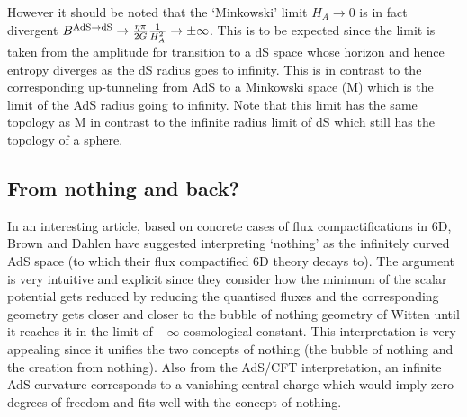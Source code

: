 \documentclass[a4paper,11pt]{article}
\numberwithin{equation}{section}
\newcommand{\citep}{\cite}
\numberwithin{equation}{section}
\begin{document}
However it should be noted that the `Minkowski' limit $H_{A} \rightarrow 0$
is in fact divergent $B^{{\rm AdS \rightarrow dS}}\rightarrow\frac{\eta\pi}{2G}\frac{1}{H_{A}^{2}}\rightarrow\pm\infty$.
This is to be expected since the limit is taken from the amplitude
for transition to a dS space whose horizon and hence entropy diverges
as the dS radius goes to infinity. This is in contrast to the corresponding
up-tunneling from AdS to a Minkowski space (M) which is the limit of the AdS radius going to infinity. Note
that this limit has the same topology as M in contrast to the infinite radius limit of dS which still has the topology of a sphere.


\subsection{From nothing and back?}

In an interesting article, based on concrete cases of flux compactifications in 6D, Brown and Dahlen \citep{Brown:2011gt} have suggested interpreting
‘nothing' as the infinitely curved AdS space (to which their flux
compactified 6D theory decays to). The argument is very intuitive and explicit since they consider how the minimum of the scalar potential gets reduced by reducing the quantised fluxes and the corresponding geometry gets closer and closer to the bubble of nothing geometry of Witten  \citep{Witten:1981gj} until it reaches it in the limit of $-\infty$ cosmological constant. This interpretation is very appealing since it unifies the two concepts of nothing (the bubble of nothing and the creation from nothing). Also from the AdS/CFT interpretation, an infinite AdS curvature corresponds to a vanishing central charge which  would imply zero degrees of freedom and fits well with the concept of nothing.
\end{document}
